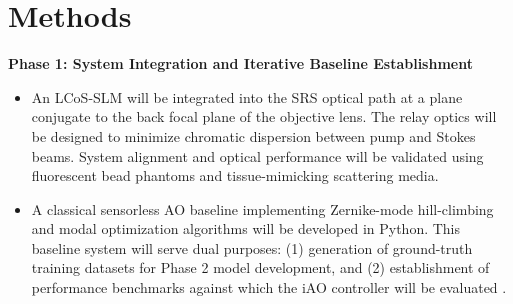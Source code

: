 \documentclass[12pt,a4paper]{article}
\begin{document}
\section{Methods}
\textbf{Phase 1: System Integration and Iterative Baseline Establishment}
\begin{itemize}
  \item An LCoS-SLM will be integrated into the SRS optical path at a plane conjugate to the back focal plane of the objective lens. The relay optics will be designed to minimize chromatic dispersion between pump and Stokes beams. System alignment and optical performance will be validated using fluorescent bead phantoms and tissue-mimicking scattering media.
  \item A classical sensorless AO baseline implementing Zernike-mode hill-climbing and modal optimization algorithms will be developed in Python. This baseline system will serve dual purposes: (1) generation of ground-truth training datasets for Phase 2 model development, and (2) establishment of performance benchmarks against which the iAO controller will be evaluated \cite{papadopoulos2008,tao2013}.
\end{itemize}
\end{document}
